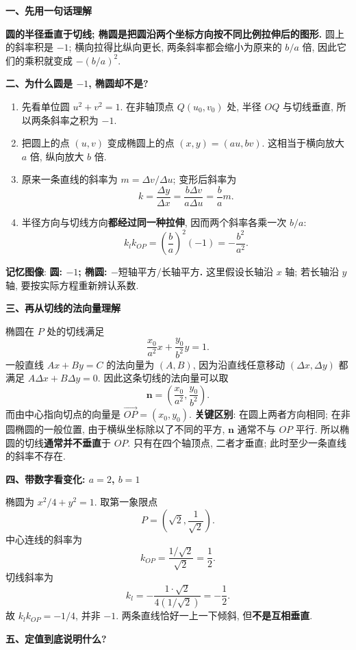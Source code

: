 \begin{explanationbox}
\textbf{一、先用一句话理解}

\textbf{圆的半径垂直于切线; 椭圆是把圆沿两个坐标方向按不同比例拉伸后的图形.}
圆上的斜率积是 $-1$; 横向拉得比纵向更长, 两条斜率都会缩小为原来的 $b/a$ 倍,
因此它们的乘积就变成 $-(b/a)^2$.

\textbf{二、为什么圆是 $-1$, 椭圆却不是?}

\begin{enumerate}
  \item 先看单位圆 $u^2+v^2=1$. 在非轴顶点 $Q(u_0,v_0)$ 处,
  半径 $OQ$ 与切线垂直, 所以两条斜率之积为 $-1$.
  \item 把圆上的点 $(u,v)$ 变成椭圆上的点 $(x,y)=(au,bv)$.
  这相当于横向放大 $a$ 倍, 纵向放大 $b$ 倍.
  \item 原来一条直线的斜率为 $m=\Delta v/\Delta u$; 变形后斜率为
  \[
  k=\frac{\Delta y}{\Delta x}
   =\frac{b\Delta v}{a\Delta u}=\frac ba m.
  \]
  \item 半径方向与切线方向\textbf{都经过同一种拉伸}, 因而两个斜率各乘一次 $b/a$:
  \[
  k_lk_{OP}=\left(\frac ba\right)^2(-1)=-\frac{b^2}{a^2}.
  \]
\end{enumerate}

\textbf{记忆图像}: \textbf{圆: $-1$; 椭圆: $-\text{短轴平方}/\text{长轴平方}$.}
这里假设长轴沿 $x$ 轴; 若长轴沿 $y$ 轴, 要按实际方程重新辨认系数.

\textbf{三、再从切线的法向量理解}

椭圆在 $P$ 处的切线满足
\[
\frac{x_0}{a^2}x+\frac{y_0}{b^2}y=1.
\]
一般直线 $Ax+By=C$ 的法向量为 $(A,B)$, 因为沿直线任意移动
$(\Delta x,\Delta y)$ 都满足 $A\Delta x+B\Delta y=0$.
因此这条切线的法向量可以取
\[
\boldsymbol n=\left(\frac{x_0}{a^2},\frac{y_0}{b^2}\right).
\]
而由中心指向切点的向量是 $\overrightarrow{OP}=(x_0,y_0)$.
\textbf{关键区别}: 在圆上两者方向相同; 在非圆椭圆的一般位置,
由于横纵坐标除以了不同的平方, $\boldsymbol n$ 通常不与 $OP$ 平行.
所以椭圆的切线\textbf{通常并不垂直}于 $OP$.
只有在四个轴顶点, 二者才垂直; 此时至少一条直线的斜率不存在.

\textbf{四、带数字看变化: $a=2$, $b=1$}

椭圆为 $x^2/4+y^2=1$. 取第一象限点
\[
P=\left(\sqrt2,\frac1{\sqrt2}\right).
\]
中心连线的斜率为
\[
k_{OP}=\frac{1/\sqrt2}{\sqrt2}=\frac12.
\]
切线斜率为
\[
k_l=-\frac{1\cdot\sqrt2}{4(1/\sqrt2)}=-\frac12.
\]
故 $k_lk_{OP}=-1/4$, 并非 $-1$.
两条直线恰好一上一下倾斜, 但\textbf{不是互相垂直}.

\textbf{五、定值到底说明什么?}


\end{explanationbox}
